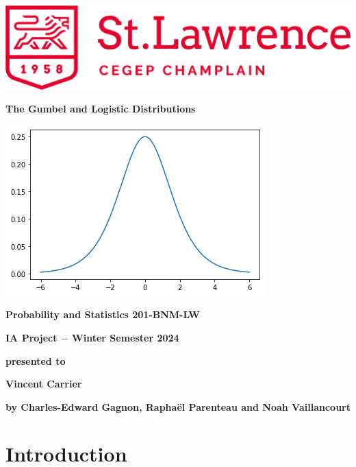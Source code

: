 \documentclass[titlepage,12 pt]{article}
\begin{document}
 

\begin{titlepage}

\begin{center}
\includegraphics[height=2 cm]{St-Lawrence_Logo.png}
\vspace{1 cm}

\Large{
{\bf The Gumbel and Logistic Distributions}
}
\vspace{1 cm}

\begin{center}
\includegraphics[height=6 cm]{Logistic-f.png}
\end{center}
\vspace{1 cm}

{\bf Probability and Statistics 201-BNM-LW}
\vspace{5 mm}

\large{

{\bf IA Project $-$ Winter Semester 2024}

{\bf presented to}

\textbf{Vincent Carrier}

\textbf{by Charles-Edward Gagnon, Raphaël Parenteau and Noah Vaillancourt}

}

\end{center}

\end{titlepage}

\tableofcontents

\pagebreak

\section{Introduction}
\end{document}
